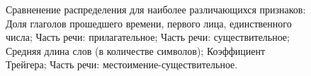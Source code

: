 \documentclass[12pt]{article}
\begin{document}
\begin{figure}[ht!]
\hspace{2ex}

\caption{Сравненение распределения для наиболее различающихся признаков:  Доля глаголов прошедшего времени, первого лица, единственного числа;  Часть речи: прилагательное;  Часть речи: существительное;  Средняя длина слов (в количестве символов);  Коэффициент Трейгера;  Часть речи: местоимение-существительное.} \label{hist}
\end{figure}
\end{document}

